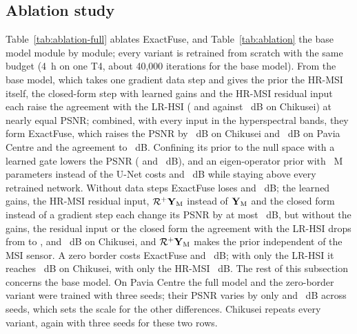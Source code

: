 \documentclass[journal]{IEEEtran}
\begin{document}
\subsection{Ablation study}
\label{sec:ablation}
Table~\ref{tab:ablation-full} ablates ExactFuse, and Table~\ref{tab:ablation} the base model module by module; every variant is retrained from scratch with the same budget (4~h on one T4, about 40{,}000 iterations for the base model). From the base model, which takes one gradient data step and gives the prior the HR-MSI itself, the closed-form step with learned gains and the HR-MSI residual input each raise the agreement with the LR-HSI ( and  against ~dB on Chikusei) at nearly equal PSNR; combined, with every input in the hyperspectral bands, they form ExactFuse, which raises the PSNR by ~dB on Chikusei and ~dB on Pavia Centre and the agreement to ~dB. Confining its prior to the null space with a learned gate lowers the PSNR ( and ~dB), and an eigen-operator prior with ~M parameters instead of the U-Net costs  and ~dB while staying above every retrained network. Without data steps ExactFuse loses  and ~dB; the learned gains, the HR-MSI residual input, $\mathcal{R}^{+}\mathbf{Y}_{\mathrm{M}}$ instead of $\mathbf{Y}_{\mathrm{M}}$ and the closed form instead of a gradient step each change its PSNR by at most ~dB, but without the gains, the residual input or the closed form the agreement with the LR-HSI drops from  to ,  and ~dB on Chikusei, and $\mathcal{R}^{+}\mathbf{Y}_{\mathrm{M}}$ makes the prior independent of the MSI sensor. A zero border costs ExactFuse  and ~dB; with only the LR-HSI it reaches ~dB on Chikusei, with only the HR-MSI ~dB. The rest of this subsection concerns the base model. On Pavia Centre the full model and the zero-border variant were trained with three seeds; their PSNR varies by only  and ~dB across seeds, which sets the scale for the other differences. Chikusei repeats every variant, again with three seeds for these two rows.
\end{document}
